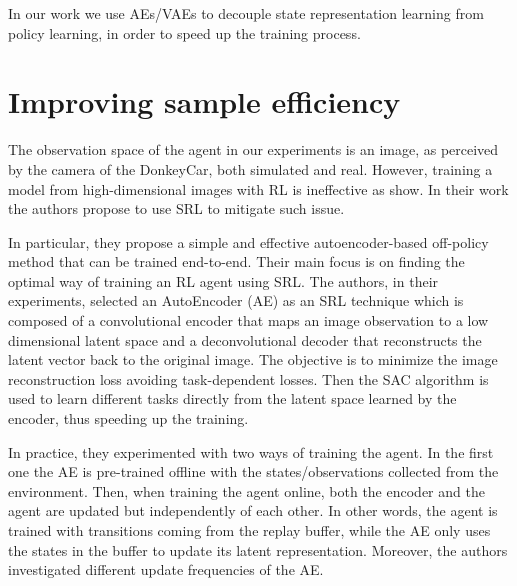 In our work we use AEs/VAEs to decouple state representation learning from policy learning, in order to speed up the training process.

\section{Improving sample efficiency} \label{sec:sampleefficiency}
The observation space of the agent in our experiments is an image, as perceived by the camera of the DonkeyCar, both simulated and real. However, training a model from high-dimensional images with RL is ineffective as \citet{DBLP:journals/corr/abs-1910-01741} show. In their work the authors propose to use SRL to mitigate such issue. 


In particular, they propose a simple and effective autoencoder-based off-policy method that can be trained end-to-end. Their main focus is on finding the optimal way of training an RL agent using SRL. The authors, in their experiments, selected an AutoEncoder (AE) as an SRL technique which is composed of a convolutional encoder that maps an image observation to a low dimensional latent space and a deconvolutional decoder that reconstructs the latent vector back to the original image. The objective is to minimize the image reconstruction loss avoiding task-dependent losses. Then the SAC algorithm is used to learn different tasks directly from the latent space learned by the encoder, thus speeding up the training.

In practice, they experimented with two ways of training the agent. In the first one the AE is pre-trained offline with the states/observations collected from the environment. Then, when training the agent online, both the encoder and the agent are updated but independently of each other. In other words, the agent is trained with transitions coming from the replay buffer, while the AE only uses the states in the buffer to update its latent representation. Moreover, the authors investigated different update frequencies of the AE.


